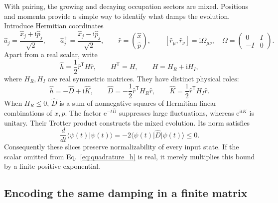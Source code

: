 \documentclass[11pt,a4paper]{article}
\newcommand{\ee}{\mathrm e}
\newcommand{\ii}{\mathrm i}
\newcommand{\trans}{\mathsf T}
\numberwithin{equation}{section}
\begin{document}
With pairing, the growing and decaying occupation sectors are mixed.
Positions and momenta provide a simple way to identify what damps the
evolution. Introduce Hermitian coordinates
\begin{equation}
 \hat a_j=\frac{\hat x_j+\ii\hat p_j}{\sqrt2},\qquad
 \hat a_j^+=\frac{\hat x_j-\ii\hat p_j}{\sqrt2},\qquad
 \hat r=\binom{\hat x}{\hat p},\qquad
 [\hat r_\mu,\hat r_\nu]=\ii\Omega_{\mu\nu},\quad
 \Omega=\begin{pmatrix}0&I\\-I&0\end{pmatrix}.
 \label{eq:quadratures}
\end{equation}
Apart from a real scalar, write
\begin{equation}
 \hat h=\frac12\hat r^\trans H\hat r,\qquad
 H^\trans=H,\qquad H=H_R+\ii H_I,
 \label{eq:quadrature_h}
\end{equation}
where $H_R,H_I$ are real symmetric matrices. They have distinct physical
roles:
\begin{equation}
 \hat h=-\hat D+\ii\hat K,\qquad
 \hat D=-\frac12\hat r^\trans H_R\hat r,\qquad
 \hat K=\frac12\hat r^\trans H_I\hat r.
 \label{eq:damping_unitary}
\end{equation}
When $H_R\leq0$, $\hat D$ is a sum of nonnegative squares of Hermitian
linear combinations of $x,p$. The factor $\ee^{-t\hat D}$ suppresses
large fluctuations, whereas $\ee^{\ii t\hat K}$ is unitary. Their Trotter
product constructs the mixed evolution. Its norm satisfies
\begin{equation}
 \frac{d}{dt}\langle\psi(t)|\psi(t)\rangle
 =-2\langle\psi(t)|\hat D|\psi(t)\rangle\leq0.
 \label{eq:norm_damping}
\end{equation}
Consequently these slices preserve normalizability of every input state.
If the scalar omitted from Eq.~\eqref{eq:quadrature_h} is real, it merely
multiplies this bound by a finite positive exponential.

\subsection{Encoding the same damping in a finite matrix}
\end{document}
